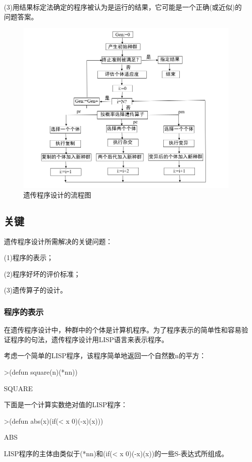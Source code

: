 \documentclass[UTF8]{ctexart}
\begin{document}
 	(3)用结果标定法确定的程序被认为是运行的结果，它可能是一个正确(或近似)的问题答案。
 	\begin{figure}[ht]
 		\centering	
 		\includegraphics[scale=0.4]{images/GP_framework.png}
 		\caption{遗传程序设计的流程图}
 		\label{fig:label}
 	\end{figure}

\subsection{关键}
遗传程序设计所需解决的关键问题：	

(1)程序的表示；

(2)程序好坏的评价标准；

(3)遗传算子的设计。

\subsubsection{程序的表示}
在遗传程序设计中，种群中的个体是计算机程序。为了程序表示的简单性和容易验证程序的句法，遗传程序设计用LISP语言来表示程序。	

考虑一个简单的LISP程序，该程序简单地返回一个自然数n的平方：

>(defun square(n)(*nn))

SQUARE

下面是一个计算实数绝对值的LISP程序：

>(defun abs(x)(if(< x 0)(-x)(x)))

ABS

LISP程序的主体由类似于(*nn)和(if(< x 0)(-x)(x))的一些S-表达式所组成。
\end{document}
